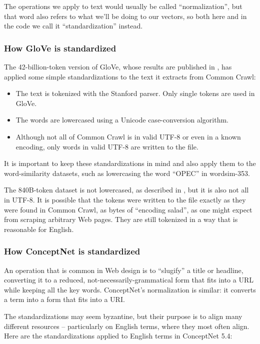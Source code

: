 \documentclass[letterpaper]{article}
\begin{document}
The operations we apply to text would usually be called ``normalization'',
but that word also refers to what we'll be doing to our vectors, so both
here and in the code we call it ``standardization'' instead.

\subsubsection{How GloVe is standardized}

The 42-billion-token version of GloVe, whose results are published in
\cite{pennington2014glove}, has applied some simple standardizations
to the text it extracts from Common Crawl:

\begin{itemize}
\item The text is tokenized with the Stanford parser. Only single tokens are
    used in GloVe.
\item The words are lowercased using a Unicode case-conversion
    algorithm.
\item Although not all of Common Crawl is in valid UTF-8 or even in a known
    encoding, only words in valid UTF-8 are written to the file.
\end{itemize}

It is important to keep these standardizations in mind and also apply them to
the word-similarity datasets, such as lowercasing the word ``OPEC'' in {\sc
wordsim-353}.

The 840B-token dataset is not lowercased, as described in
\cite{pennington2014glove}, but it is also not all in UTF-8. It is possible
that the tokens were written to the file exactly as they were found in
Common Crawl, as bytes of ``encoding salad'', as one might expect from
scraping arbitrary Web pages. They are still tokenized in a way that is
reasonable for English.

\subsubsection{How ConceptNet is standardized}

An operation that is common in Web design is to ``slugify'' a title or
headline, converting it to a reduced, not-necessarily-grammatical form
that fits into a URL while keeping all the key words. ConceptNet's
normalization is similar: it converts a term into a form that fits into
a URI.

The standardizations may seem byzantine, but their purpose is to align many
different resources -- particularly on English terms, where they most often
align. Here are the standardizations applied to English terms in ConceptNet
5.4:
\end{document}
